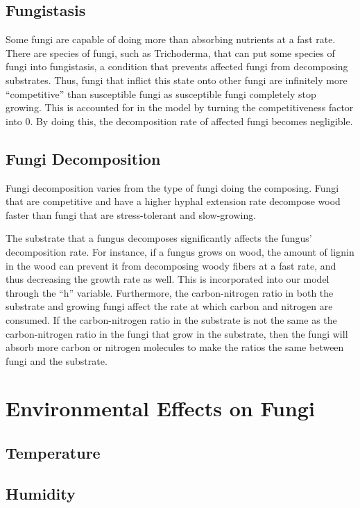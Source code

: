 \documentclass[twocolumn]{article} %
\begin{document}
\subsection{Fungistasis}

Some fungi are capable of doing more than absorbing nutrients at a fast rate. There are species of fungi, such as Trichoderma, that can put some species of fungi into fungistasis, a condition that prevents affected fungi from decomposing substrates. Thus, fungi that inflict this state onto other fungi are infinitely more “competitive” than susceptible fungi as susceptible fungi completely stop growing. This is accounted for in the model by turning the competitiveness factor into 0. By doing this, the decomposition rate of affected fungi becomes negligible.

\subsection{Fungi Decomposition}

Fungi decomposition varies from the type of fungi doing the composing. Fungi that are competitive and have a higher hyphal extension rate decompose wood faster than fungi that are stress-tolerant and slow-growing. 

The substrate that a fungus decomposes significantly affects the fungus’ decomposition rate. For instance, if a fungus grows on wood, the amount of lignin in the wood can prevent it from decomposing woody fibers at a fast rate, and thus decreasing the growth rate as well. This is incorporated into our model through the “h” variable. Furthermore, the carbon-nitrogen ratio in both the substrate and growing fungi affect the rate at which carbon and nitrogen are consumed. If the carbon-nitrogen ratio in the substrate is not the same as the carbon-nitrogen ratio in the fungi that grow in the substrate, then the fungi will absorb more carbon or nitrogen molecules to make the ratios the same between fungi and the substrate.


\section{Environmental Effects on Fungi}

\subsection{Temperature}

\subsection{Humidity}
\end{document}
